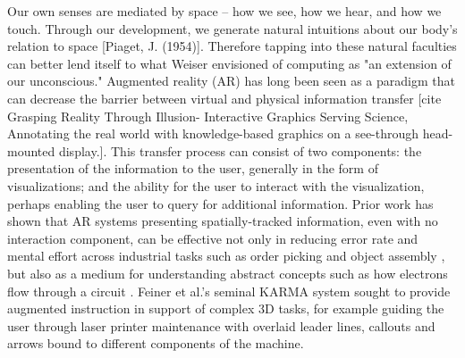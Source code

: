 \documentclass [11pt, proquest] {uwthesis}[2020/02/24]
\begin{document}
Our own senses are mediated by space -- how we see, how we hear, and how we touch. Through our development, we generate natural intuitions about our body's relation to space [Piaget, J. (1954)]. Therefore tapping into these natural faculties can better lend itself to what Weiser envisioned of computing as "an extension of our unconscious." 
Augmented reality (AR) has long been seen as a paradigm that can decrease the barrier between virtual and physical information transfer [cite Grasping Reality Through Illusion- Interactive Graphics Serving Science, Annotating the real world with knowledge-based graphics on a see-through head-mounted display.].
This transfer process can consist of two components: the presentation of the information to the user, generally in the form of visualizations; and the ability for the user to interact with the visualization, perhaps enabling the user to query for additional information.
Prior work has shown that AR systems presenting spatially-tracked information, even with no interaction component, can be effective not only in reducing error rate and mental effort across industrial tasks such as order picking \cite{Schwerdtfeger2008SupportingReality} and object assembly \cite{Caudell1992AugmentedProcesses, Tang2003ComparativeAssembly}, but also as a medium for understanding abstract concepts such as how electrons flow through a circuit \cite{Conradi2011FlowElectrons, Chan2013LightUp}.
Feiner et al.’s seminal KARMA system \cite{Feiner1993Knowledge-basedReality} sought to provide augmented instruction in support of complex 3D tasks, for example guiding the user through laser printer maintenance with overlaid leader lines, callouts and arrows bound to different components of the machine. 
\end{document}
